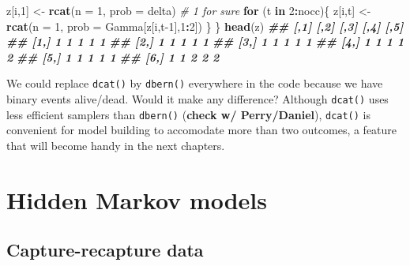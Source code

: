 \documentclass[
  12pt,
]{krantz}
\newenvironment{Shaded}{\begin{snugshade}}{\end{snugshade}}
\newcommand{\AttributeTok}[1]{\textcolor[rgb]{0.13,0.29,0.53}{#1}}
\newcommand{\CommentTok}[1]{\textcolor[rgb]{0.56,0.35,0.01}{\textit{#1}}}
\newcommand{\ControlFlowTok}[1]{\textcolor[rgb]{0.13,0.29,0.53}{\textbf{#1}}}
\newcommand{\DecValTok}[1]{\textcolor[rgb]{0.00,0.00,0.81}{#1}}
\newcommand{\DocumentationTok}[1]{\textcolor[rgb]{0.56,0.35,0.01}{\textbf{\textit{#1}}}}
\newcommand{\FunctionTok}[1]{\textcolor[rgb]{0.13,0.29,0.53}{\textbf{#1}}}
\newcommand{\NormalTok}[1]{#1}
\newcommand{\OtherTok}[1]{\textcolor[rgb]{0.56,0.35,0.01}{#1}}
\newcommand{\SpecialCharTok}[1]{\textcolor[rgb]{0.81,0.36,0.00}{\textbf{#1}}}
\begin{document}
\begin{Shaded}
\begin{Highlighting}[]
\NormalTok{  z[i,}\DecValTok{1}\NormalTok{] }\OtherTok{\textless{}{-}} \FunctionTok{rcat}\NormalTok{(}\AttributeTok{n =} \DecValTok{1}\NormalTok{, }\AttributeTok{prob =}\NormalTok{ delta) }\CommentTok{\# 1 for sure}
  \ControlFlowTok{for}\NormalTok{ (t }\ControlFlowTok{in} \DecValTok{2}\SpecialCharTok{:}\NormalTok{nocc)\{}
\NormalTok{    z[i,t] }\OtherTok{\textless{}{-}} \FunctionTok{rcat}\NormalTok{(}\AttributeTok{n =} \DecValTok{1}\NormalTok{, }\AttributeTok{prob =}\NormalTok{ Gamma[z[i,t}\DecValTok{{-}1}\NormalTok{],}\DecValTok{1}\SpecialCharTok{:}\DecValTok{2}\NormalTok{]) }
\NormalTok{  \}}
\NormalTok{\}}
\FunctionTok{head}\NormalTok{(z) }
\DocumentationTok{\#\#      [,1] [,2] [,3] [,4] [,5]}
\DocumentationTok{\#\# [1,]    1    1    1    1    1}
\DocumentationTok{\#\# [2,]    1    1    1    1    1}
\DocumentationTok{\#\# [3,]    1    1    1    1    1}
\DocumentationTok{\#\# [4,]    1    1    1    1    2}
\DocumentationTok{\#\# [5,]    1    1    1    1    1}
\DocumentationTok{\#\# [6,]    1    1    2    2    2}
\end{Highlighting}
\end{Shaded}

We could replace \texttt{dcat()} by \texttt{dbern()} everywhere in the code because we have binary events alive/dead. Would it make any difference? Although \texttt{dcat()} uses less efficient samplers than \texttt{dbern()} (\textbf{check w/ Perry/Daniel}), \texttt{dcat()} is convenient for model building to accomodate more than two outcomes, a feature that will become handy in the next chapters.

\hypertarget{hidden-markov-models}{%
\section{Hidden Markov models}\label{hidden-markov-models}}

\hypertarget{capturerecapturedata}{%
\subsection{Capture-recapture data}\label{capturerecapturedata}}
\end{document}
